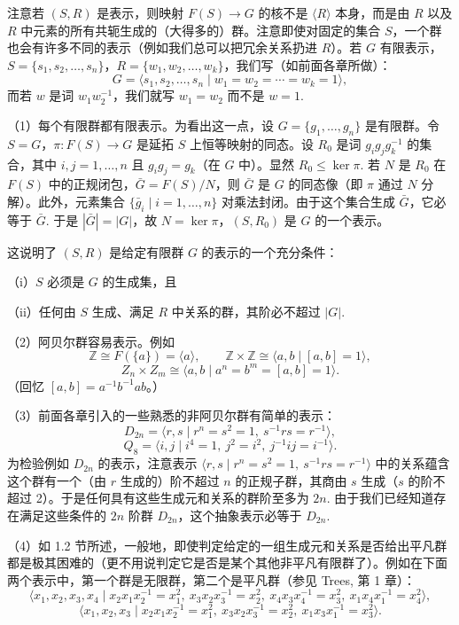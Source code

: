 注意若 \((S, R)\) 是表示，则映射 \(F(S) \to G\) 的核不是 \(\langle R \rangle\) 本身，而是由 \(R\) 以及 \(R\) 中元素的所有共轭生成的（大得多的）群。注意即使对固定的集合 \(S\)，一个群也会有许多不同的表示（例如我们总可以把冗余关系扔进 \(R\)）。若 \(G\) 有限表示，\(S = \{s_1, s_2, \ldots, s_n\}\)，\(R = \{w_1, w_2, \ldots, w_k\}\)，我们写（如前面各章所做）：
\[
G = \langle s_1, s_2, \ldots, s_n \mid w_1 = w_2 = \cdots = w_k = 1 \rangle,
\]
而若 \(w\) 是词 \(w_1w_2^{-1}\)，我们就写 \(w_1 = w_2\) 而不是 \(w = 1\).

\begin{example}
（1）每个有限群都有限表示。为看出这一点，设 \(G = \{g_1, \ldots, g_n\}\) 是有限群。令 \(S = G\)，\(\pi : F(S) \to G\) 是延拓 \(S\) 上恒等映射的同态。设 \(R_0\) 是词 \(g_ig_jg_k^{-1}\) 的集合，其中 \(i, j = 1, \ldots, n\) 且 \(g_ig_j = g_k\)（在 \(G\) 中）。显然 \(R_0 \leq \ker \pi\). 若 \(N\) 是 \(R_0\) 在 \(F(S)\) 中的正规闭包，\(\bar{G} = F(S)/N\)，则 \(\bar{G}\) 是 \(G\) 的同态像（即 \(\pi\) 通过 \(N\) 分解）。此外，元素集合 \(\{\bar{g}_i \mid i = 1, \ldots, n\}\) 对乘法封闭。由于这个集合生成 \(\bar{G}\)，它必等于 \(\bar{G}\). 于是 \(|\bar{G}| = |G|\)，故 \(N = \ker \pi\)，\((S, R_0)\) 是 \(G\) 的一个表示。

这说明了 \((S, R)\) 是给定有限群 \(G\) 的表示的一个充分条件：

（i）\(S\) 必须是 \(G\) 的生成集，且

（ii）任何由 \(S\) 生成、满足 \(R\) 中关系的群，其阶必不超过 \(|G|\).

（2）阿贝尔群容易表示。例如
\[
\mathbb{Z} \cong F(\{a\}) = \langle a \rangle, \qquad \mathbb{Z} \times \mathbb{Z} \cong \langle a, b \mid [a, b] = 1 \rangle,
\]
\[
Z_n \times Z_m \cong \langle a, b \mid a^n = b^m = [a, b] = 1 \rangle.
\]
（回忆 \([a, b] = a^{-1}b^{-1}ab\)。）

（3）前面各章引入的一些熟悉的非阿贝尔群有简单的表示：
\[
D_{2n} = \langle r, s \mid r^n = s^2 = 1,\ s^{-1}rs = r^{-1} \rangle,
\]
\[
Q_8 = \langle i, j \mid i^4 = 1,\ j^2 = i^2,\ j^{-1}ij = i^{-1} \rangle.
\]
为检验例如 \(D_{2n}\) 的表示，注意表示 \(\langle r, s \mid r^n = s^2 = 1,\ s^{-1}rs = r^{-1} \rangle\) 中的关系蕴含这个群有一个（由 \(r\) 生成的）阶不超过 \(n\) 的正规子群，其商由 \(s\) 生成（\(s\) 的阶不超过 2）。于是任何具有这些生成元和关系的群阶至多为 \(2n\). 由于我们已经知道存在满足这些条件的 \(2n\) 阶群 \(D_{2n}\)，这个抽象表示必等于 \(D_{2n}\).

（4）如 1.2 节所述，一般地，即使判定给定的一组生成元和关系是否给出平凡群都是极其困难的（更不用说判定它是否是某个其他非平凡有限群了）。例如在下面两个表示中，第一个群是无限群，第二个是平凡群（参见 Trees, 第 1 章）：
\[
\langle x_1, x_2, x_3, x_4 \mid x_2x_1x_2^{-1} = x_1^2,\ x_3x_2x_3^{-1} = x_2^2,\ x_4x_3x_4^{-1} = x_3^2,\ x_1x_4x_1^{-1} = x_4^2 \rangle,
\]
\[
\langle x_1, x_2, x_3 \mid x_2x_1x_2^{-1} = x_1^2,\ x_3x_2x_3^{-1} = x_2^2,\ x_1x_3x_1^{-1} = x_3^2 \rangle.
\]


\end{example}
